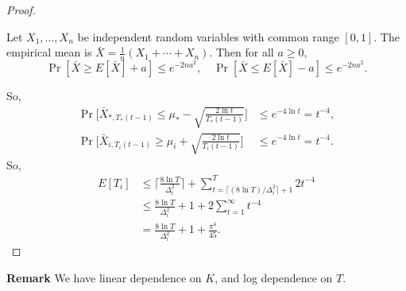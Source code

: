 \begin{proof}
    \begin{framed}
        \begin{fact}
            Let $X_1, \dots, X_n$ be independent random variables with common range $[0,1]$.
            The empirical mean is $\bar X=\frac{1}{n}(X_1+\cdots+ X_n)$.
            Then for all $a\ge0$,
            \begin{equation}
                \Pr[\bar X\ge E[\bar X] + a] \le e^{-2na^2}, \quad
                \Pr[\bar X\le E[\bar X] - a] \le e^{-2na^2}.
            \end{equation}
        \end{fact}
    \end{framed}
    So,
    \begin{align}
        \Pr\bigg[\bar X_{*,T_*(t-1)} \le \mu_* - \sqrt{\frac{2\ln t}{T_{*}(t-1)}}\bigg]
            &\le e^{-4\ln t} = t^{-4}, \\
        \Pr\bigg[\bar X_{i,T_i(t-1)} \ge \mu_i + \sqrt{\frac{2\ln t}{T_{i}(t-1)}}\bigg]
            &\le e^{-4\ln t} = t^{-4}.
    \end{align}
    So,
    \begin{align}
        E[T_i]
            &\le \bigg\lceil \frac{8\ln T}{\Delta_i^2}\bigg\rceil + \sum_{t=\lceil (8\ln T)/\Delta_i^2\rceil+1}^T 2t^{-4} \\
            &\le \frac{8\ln T}{\Delta_i^2} + 1 + 2\sum_{t=1}^\infty t^{-4} \\
            &= \frac{8\ln T}{\Delta_i^2} + 1 + \frac{\pi^4}{45}.
    \end{align}
\end{proof}

\textbf{Remark}
We have linear dependence on $K$,
and log dependence on $T$.
